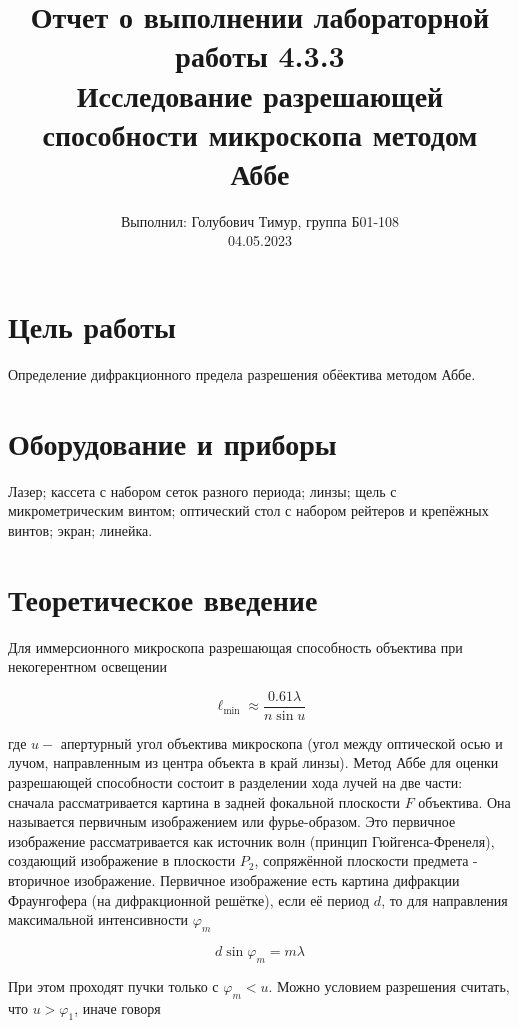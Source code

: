 \documentclass[12pt,a4paper]{article}
\author{\normalsize Выполнил: Голубович Тимур, группа Б01-108 \\
    	\normalsize 04.05.2023}
\date{}
\title{
    	\large Отчет о выполнении лабораторной работы 4.3.3 \\
    	\Large Исследование разрешающей способности микроскопа методом Аббе
     }
\begin{document}
    	\maketitle
    	
    \section*{Цель работы}
    Определение дифракционного предела разрешения обёектива методом Аббе.
    
    \section*{Оборудование и приборы} 
    Лазер;
    кассета с набором сеток разного периода;
    линзы;
    щель с микрометрическим винтом;
    оптический стол с набором рейтеров и крепёжных винтов;
    экран;
    линейка.

	
    \section*{Теоретическое введение}

    Для иммерсионного микроскопа разрешающая способность объектива при некогерентном
    освещении
    
    \begin{equation}
    \ell_{\min } \approx \frac{0.61 \lambda}{n \sin u}
    \end{equation}
    
    где $u-$ апертурный угол объектива микроскопа (угол между оптической осью и лучом, направленным из центра объекта в край линзы).
    Метод Аббе для оценки разрешающей способности состоит в разделении хода лучей на две части: сначала рассматривается картина в задней фокальной плоскости $F$ объектива. Она называется первичным изображением или фурье-образом. Это первичное изображение рассматривается как источник волн (принцип Гюйгенса-Френеля), создающий изображение в плоскости $P_{2}$, сопряжённой плоскости предмета - вторичное изображение. Первичное изображение есть картина дифракции Фраунгофера (на дифракционной решётке), если её период $d$, то для направления максимальной интенсивности $\varphi_{m}$
    
    \begin{equation}
    d \sin \varphi_{m}=m \lambda
    \end{equation}
    
    При этом проходят пучки только с $\varphi_{m}<u .$ Можно условием разрешения считать, что $u>\varphi_{1}$, иначе говоря
    
\end{document}
